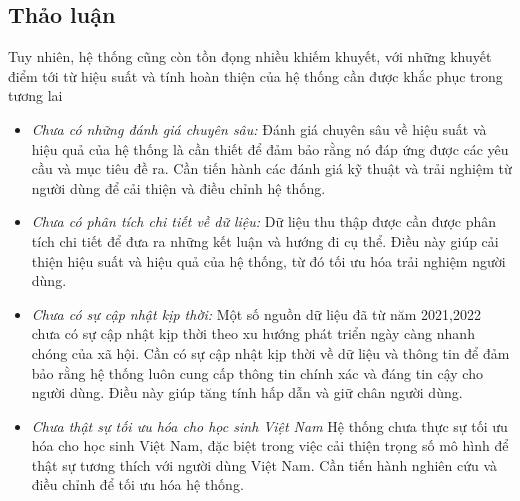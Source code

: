     \subsection{Thảo luận}
        Tuy nhiên, hệ thống cũng còn tồn đọng nhiều khiếm khuyết, với những khuyết điểm tới từ hiệu suất và tính hoàn thiện của hệ thống cần được khắc phục trong tương lai
        \begin{itemize}
            \item \textit{Chưa có những đánh giá chuyên sâu:} Đánh giá chuyên sâu về hiệu suất và hiệu quả của hệ thống là cần thiết để đảm bảo rằng nó đáp ứng được các yêu cầu và mục tiêu đề ra. Cần tiến hành các đánh giá kỹ thuật và trải nghiệm từ người dùng để cải thiện và điều chỉnh hệ thống.
            \item \textit{Chưa có phân tích chi tiết về dữ liệu:} Dữ liệu thu thập được cần được phân tích chi tiết để đưa ra những kết luận và hướng đi cụ thể. Điều này giúp cải thiện hiệu suất và hiệu quả của hệ thống, từ đó tối ưu hóa trải nghiệm người dùng.
            \item \textit{Chưa có sự cập nhật kịp thời:} Một số nguồn dữ liệu đã từ năm 2021,2022 chưa có sự cập nhật kịp thời theo xu hướng phát triển ngày càng nhanh chóng của xã hội. Cần có sự cập nhật kịp thời về dữ liệu và thông tin để đảm bảo rằng hệ thống luôn cung cấp thông tin chính xác và đáng tin cậy cho người dùng. Điều này giúp tăng tính hấp dẫn và giữ chân người dùng.
            \item \textit{Chưa thật sự tối ưu hóa cho học sinh Việt Nam} Hệ thống chưa thực sự tối ưu hóa cho học sinh Việt Nam, đặc biệt trong việc cải thiện trọng số mô hình để thật sự tương thích với  người dùng Việt Nam. Cần tiến hành nghiên cứu và điều chỉnh để tối ưu hóa hệ thống.
        \end{itemize}